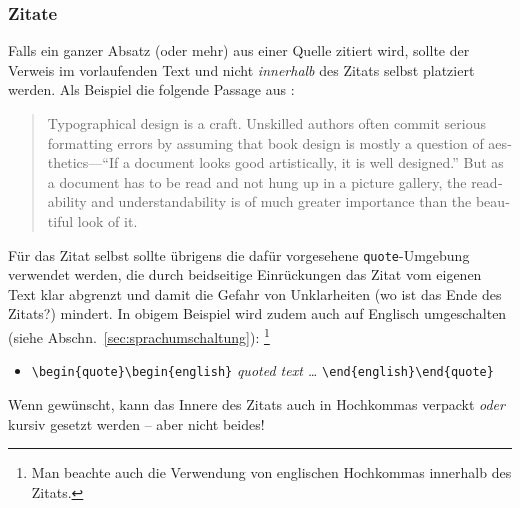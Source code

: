\subsubsection{Zitate}
Falls ein ganzer Absatz (oder mehr) aus einer Quelle zitiert wird,
sollte der Verweis im vorlaufenden Text und nicht
\emph{innerhalb} des Zitats selbst platziert werden. Als Beispiel die folgende Passage
aus \cite{Oetiker2018}:
%
\begin{quote}\begin{english}
Typographical design is a craft. Unskilled authors often commit
serious formatting errors by assuming that book design is mostly a
question of aesthetics---``If a document looks good artistically,
it is well designed.'' But as a document has to be read and not
hung up in a picture gallery, the readability and
understandability is of much greater importance than the beautiful
look of it.
\end{english}\end{quote}
%
Für das Zitat selbst sollte übrigens die dafür vorgesehene \texttt{quote}-Umgebung
verwendet werden, die durch beidseitige Einrückungen das
Zitat vom eigenen Text klar abgrenzt und damit die Gefahr von
Unklarheiten (wo ist das Ende des Zitats?) mindert.
In obigem Beispiel wird zudem auch auf Englisch umgeschalten
(siehe Abschn.\ \ref{sec:sprachumschaltung}):%
\footnote{Man beachte auch die Verwendung von englischen Hochkommas innerhalb des Zitats.}
%
\begin{itemize}
 \item[] \verb!\begin{quote}\begin{english}! \emph{quoted text \ldots} \verb!\end{english}\end{quote}!
\end{itemize}
%
Wenn gewünscht, kann das Innere des Zitats auch in Hochkommas verpackt 
\emph{oder} kursiv gesetzt werden -- aber nicht beides!

